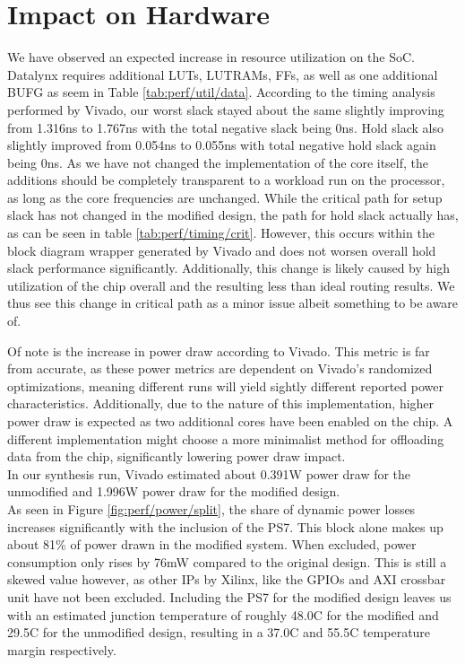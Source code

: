 \documentclass[../bachelor_paper.tex]{subfiles}
\begin{document}
\chapter{Impact on Hardware}
    \label{ch:perf}
    
We have observed an expected increase in resource utilization on the \ac{SoC}. Datalynx requires additional \acp{LUT}, \acsp{LUTRAM}, \acp{FF}, as well as one additional \ac{BUFG} as seem in Table \ref{tab:perf/util/data}. According to the timing analysis performed by Vivado, our worst slack stayed about the same slightly improving from 1.316ns to 1.767ns with the total negative slack being 0ns. Hold slack also slightly improved from 0.054ns to 0.055ns with total negative hold slack again being 0ns. As we have not changed the implementation of the core itself, the additions should be completely transparent to a workload run on the processor, as long as the core frequencies are unchanged. While the critical path for setup slack has not changed in the modified design, the path for hold slack actually has, as can be seen in table \ref{tab:perf/timing/crit}. However, this occurs within the block diagram wrapper generated by Vivado and does not worsen overall hold slack performance significantly. Additionally, this change is likely caused by high utilization of the chip overall and the resulting less than ideal routing results. We thus see this change in critical path as a minor issue albeit something to be aware of.

Of note is the increase in power draw according to Vivado. This metric is far from accurate, as these power metrics are dependent on Vivado's randomized optimizations, meaning different runs will yield sightly different reported power characteristics. Additionally, due to the nature of this implementation, higher power draw is expected as two additional cores have been enabled on the chip. A different implementation might choose a more minimalist method for offloading data from the chip, significantly lowering power draw impact.\\
In our synthesis run, Vivado estimated about 0.391W power draw for the unmodified and 1.996W power draw for the modified design. \\
As seen in Figure \ref{fig:perf/power/split}, the share of dynamic power losses increases significantly with the inclusion of the \ac{PS7}. This block alone makes up about 81\% of power drawn in the modified system. When excluded, power consumption only rises by 76mW compared to the original design. This is still a skewed value however, as other \acp{IP} by Xilinx, like the GPIOs and AXI crossbar unit have not been excluded. Including the \ac{PS7} for the modified design leaves us with an estimated junction temperature of roughly 48.0\textdegree C for the modified and 29.5\textdegree C for the unmodified design, resulting in a 37.0\textdegree C and 55.5\textdegree C temperature margin respectively.
\end{document}

